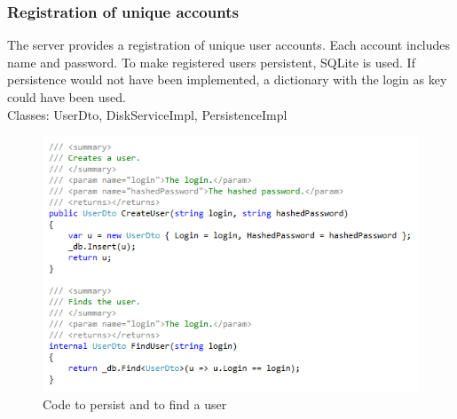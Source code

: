 \documentclass[JCDReport.tex]{subfiles}
\begin{document}
\subsubsection{Registration of unique accounts}
The server provides a registration of unique user accounts. Each account includes name and password. To make registered users persistent, SQLite is used. If persistence would not have been implemented, a dictionary with the login as key could have been used.\\
Classes: UserDto, DiskServiceImpl, PersistenceImpl
\begin{figure}[h!]
	\centering
	\includegraphics[scale=1]{imageslukas/login_server.png} 
	\caption{Code to persist and to find a user}
\end{figure}


\end{document}
